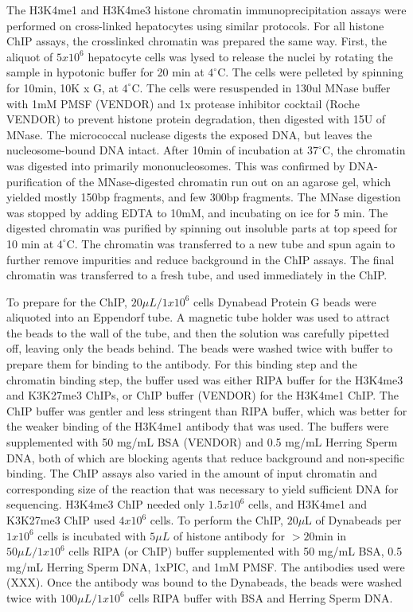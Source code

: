 \documentclass[10pt,letterpaper]{article}
\begin{document}
The H3K4me1 and H3K4me3 histone chromatin immunoprecipitation assays
were performed on cross-linked hepatocytes using similar protocols. For
all histone ChIP assays, the crosslinked chromatin was prepared the same
way. First, the aliquot of \(5x10^6\) hepatocyte cells was lysed to
release the nuclei by rotating the sample in hypotonic buffer for 20 min
at \(4^\circ\)C. The cells were pelleted by spinning for 10min, 10K x G,
at \(4^\circ\)C. The cells were resuspended in 130ul MNase buffer with
1mM PMSF (VENDOR) and 1x protease inhibitor cocktail (Roche VENDOR) to
prevent histone protein degradation, then digested with 15U of MNase.
The micrococcal nuclease digests the exposed DNA, but leaves the
nucleosome-bound DNA intact. After 10min of incubation at \(37^\circ\)C,
the chromatin was digested into primarily mononucleosomes. This was
confirmed by DNA-purification of the MNase-digested chromatin run out on
an agarose gel, which yielded mostly 150bp fragments, and few 300bp
fragments. The MNase digestion was stopped by adding EDTA to 10mM, and
incubating on ice for 5 min. The digested chromatin was purified by
spinning out insoluble parts at top speed for 10 min at \(4^\circ\)C.
The chromatin was transferred to a new tube and spun again to further
remove impurities and reduce background in the ChIP assays. The final
chromatin was transferred to a fresh tube, and used immediately in the
ChIP.

To prepare for the ChIP, \(20\mu L/1x10^6\) cells Dynabead Protein G
beads were aliquoted into an Eppendorf tube. A magnetic tube holder was
used to attract the beads to the wall of the tube, and then the solution
was carefully pipetted off, leaving only the beads behind. The beads
were washed twice with buffer to prepare them for binding to the
antibody. For this binding step and the chromatin binding step, the
buffer used was either RIPA buffer for the H3K4me3 and K3K27me3 ChIPs,
or ChIP buffer (VENDOR) for the H3K4me1 ChIP. The ChIP buffer was
gentler and less stringent than RIPA buffer, which was better for the
weaker binding of the H3K4me1 antibody that was used. The buffers were
supplemented with 50 mg/mL BSA (VENDOR) and 0.5 mg/mL Herring Sperm DNA,
both of which are blocking agents that reduce background and
non-specific binding. The ChIP assays also varied in the amount of input
chromatin and corresponding size of the reaction that was necessary to
yield sufficient DNA for sequencing. H3K4me3 ChIP needed only
\(1.5 x 10^6\) cells, and H3K4me1 and K3K27me3 ChIP used \(4 x 10^6\)
cells. To perform the ChIP, \(20\mu\)L of Dynabeads per \(1 x 10^6\)
cells is incubated with \(5\mu L\) of histone antibody for \(>20\)min in
\(50\mu L/1x10^6\) cells RIPA (or ChIP) buffer supplemented with 50
mg/mL BSA, 0.5 mg/mL Herring Sperm DNA, 1xPIC, and 1mM PMSF. The
antibodies used were (XXX). Once the antibody was bound to the
Dynabeads, the beads were washed twice with \(100\mu L/1x10^6\) cells
RIPA buffer with BSA and Herring Sperm DNA.
\end{document}
